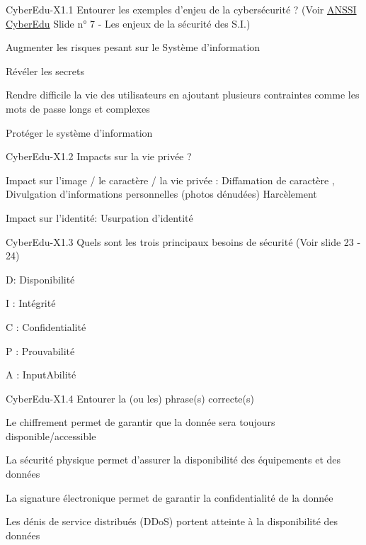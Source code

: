 

\begin{multi}[multiple=true]{CyberEdu-X1.1}
	Entourer les exemples d'enjeu de la cybersécurité ? (Voir \href{https://www.ssi.gouv.fr/administration/formations/cyberedu/contenu-pedagogique-cyberedu/}{ANSSI CyberEdu} Slide n° 7 - Les enjeux de la sécurité des S.I.)
\item 	Augmenter les risques pesant sur le Système d'information
\item 	Révéler les secrets
\item	Rendre difficile la vie des utilisateurs en ajoutant plusieurs contraintes comme les mots de passe longs et complexes
\item* 	Protéger le système d'information
\end{multi}

\begin{multi}[multiple=true]{CyberEdu-X1.2}
	Impacts sur la vie privée  ?
\item* 	Impact sur l'image / le caractère / la vie privée : Diffamation de caractère , Divulgation d'informations personnelles (photos dénudées) Harcèlement
\item*	Impact sur l'identité: Usurpation d'identité
 \end{multi}

\begin{multi}[multiple=true]{CyberEdu-X1.3}
	Quels sont les trois principaux besoins de sécurité (Voir slide 23 - 24)
\item* 	D: Disponibilité
\item* 	I : Intégrité
\item*	C : Confidentialité
\item  P : Prouvabilité
\item  A : InputAbilité
\end{multi}


\begin{multi}[multiple=true]{CyberEdu-X1.4}
	Entourer la (ou les) phrase(s) correcte(s)
\item 	Le chiffrement permet de garantir que la donnée sera toujours disponible/accessible
\item* 	La sécurité physique permet d'assurer la disponibilité des équipements et des données
\item 	La signature électronique permet de garantir la confidentialité de la donnée
\item*	Les dénis de service distribués (DDoS) portent atteinte à la disponibilité des données
\end{multi}



